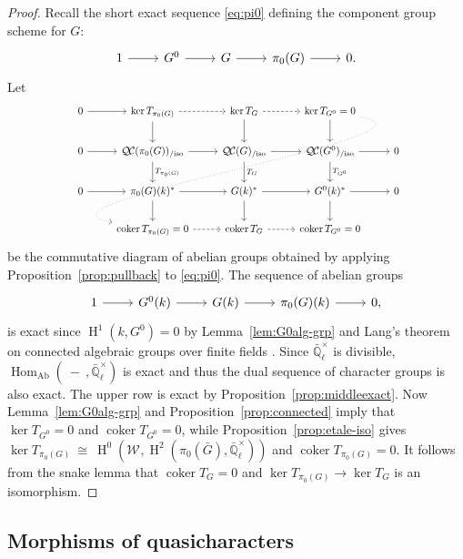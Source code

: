 \documentclass{amsart}
\theoremstyle{plain}
\theoremstyle{definition}
\theoremstyle{remark}
\newcommand{\EE}{\mathbb{\bar Q}_\ell}
\newcommand{\Fq}{k}
\newcommand{\EEx}{\EE^\times}
\newcommand{\Weil}[1]{\mathcal{W}_{#1}}
\DeclareMathOperator{\Hom}{Hom}
\DeclareMathOperator{\coker}{coker}
\DeclareMathOperator{\Hh}{H}
\newcommand{\iso}{{\ \cong\ }}
\newcommand{\QC}{{\mathcal{Q\hskip-0.8pt C}}}
\newcommand{\QCiso}[1]{\QC(#1)_{/\text{iso}}}
\newcommand{\TrFrob}[1]{T_{#1}}
\begin{document}
\begin{proof}
  Recall the short exact sequence \eqref{eq:pi0}
  defining the component group scheme for $G$:
  \[
  \begin{tikzcd}
    1 \rar & G^0 \rar & G \rar & \pi_0(G) \rar & 0.
  \end{tikzcd}
  \]
  Let
  \[
  \begin{tikzcd}[row sep=20]
    0 \rar & \ker \TrFrob{\pi_0(G)} \arrow[dashed]{r} \dar & \arrow{d} \ker \TrFrob{G} \arrow[dashed]{r} & \ker \TrFrob{G^0} =0 \arrow[dotted, out=-10, in=170]{dddll} \dar & \\
    0 \rar & \QCiso{\pi_0(G)} \rar \dar{\TrFrob{\pi_0(G)}}
    & \QCiso{G} \rar \dar{\TrFrob{G}} & \QCiso{G^0} \rar \dar{\TrFrob{G^0}} & 0\\
    0 \rar & \pi_0(G)(\Fq)^* \rar \dar
    & \arrow{d} G(\Fq)^* \rar & G^0(\Fq)^* \rar \dar & 0\\
    & \coker \TrFrob{\pi_0(G)} =0 \arrow[dashed]{r} & \coker \TrFrob{G} \arrow[dashed]{r} &  \coker \TrFrob{G^0} =0 &
  \end{tikzcd}
  \]
  be the commutative diagram of abelian groups obtained by applying
  Proposition~\ref{prop:pullback} to \eqref{eq:pi0}.
  The sequence of abelian groups
  \begin{equation}\label{eq:pi0k}
  \begin{tikzcd}
    1 \rar & G^0(\Fq) \rar & G(\Fq) \rar & \pi_0(G)(\Fq) \rar & 0,
  \end{tikzcd}
  \end{equation}
  is exact since $\Hh^1(\Fq,G^0) =0$ by Lemma~\ref{lem:G0alg-grp} and Lang's theorem on connected algebraic groups over finite fields \cite{lang:56a}.
  Since $\EEx$ is divisible, $\Hom_\text{Ab}(\ - \ ,\EEx)$ is exact and thus the dual sequence of
  character groups is also exact.
%
  The upper row is exact by Proposition~\ref{prop:middleexact}.
  Now Lemma~\ref{lem:G0alg-grp} and Proposition~\ref{prop:connected}
  imply that $\ker \TrFrob{G^0} =0$ and $\coker \TrFrob{G^0}=0$,
  while Proposition~\ref{prop:etale-iso} gives $\ker \TrFrob{\pi_0(G)} \iso \Hh^0(\Weil{},\Hh^2(\pi_0({\bar G}),\EEx))$
  and $\coker \TrFrob{\pi_0(G)}=0$.
%
It follows from the snake lemma that $\coker \TrFrob{G} =0$
and $\ker \TrFrob{\pi_0(G)} \to \ker \TrFrob{G}$ is an isomorphism.
\end{proof}

\subsection{Morphisms of quasicharacters}
\end{document}
